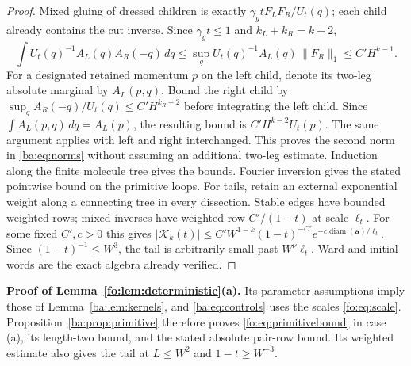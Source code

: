 \documentclass[11pt]{article}
\numberwithin{equation}{section}
\theoremstyle{remark}
\newcommand{\diam}{\operatorname{diam}}
\newcommand{\cK}{\mathcal K}
\begin{document}
\begin{proof}
Mixed gluing of dressed children is exactly $\gamma_g tF_LF_R/U_t(q)$;
each child already contains the cut inverse. Since $\gamma_g t\le1$
and $k_L+k_R=k+2$,
\[
 \int U_t(q)^{-1} A_L(q)A_R(-q)\,dq
 \le\sup_qU_t(q)^{-1} A_L(q)\,\|F_R\|_1
 \le C'H^{k-1}.
\]
For a designated retained momentum $p$ on the left child, denote
its two-leg absolute marginal by $A_L(p,q)$. Bound the right child
by \(\sup_q A_R(-q)/U_t(q)\le
C'H^{k_R-2}\) before integrating the left child.
Since \(\int A_L(p,q)\,dq=A_L(p)\), the resulting bound is
\(C'H^{k-2}U_t(p)\).
The same argument applies with left and right interchanged.
This proves the second norm in \eqref{ba:eq:norms} without assuming
an additional two-leg estimate. Induction along the finite molecule tree gives
the bounds. Fourier inversion gives the stated pointwise bound on the primitive loops.
For tails, retain an external exponential weight along a connecting
tree in every dissection. Stable edges have bounded weighted rows;
mixed inverses have weighted row $C'/(1-t)$ at scale $\ell_t$.
For some fixed $C',c>0$ this gives
$|\cK_k(t)|\le C'W^{1-k}(1-t)^{-C'}
e^{-c\diam(\boldsymbol a)/\ell_t}$. Since $(1-t)^{-1}\le W^3$,
the tail is arbitrarily small past $W^\nu\ell_t$.
Ward and initial words are the exact algebra already verified.
\end{proof}

\noindent\textbf{Proof of Lemma~\ref{fo:lem:deterministic}(a).}
Its parameter assumptions imply those of Lemma~\ref{ba:lem:kernels},
and \eqref{ba:eq:controls} uses the scales \eqref{fo:eq:scale}.
Proposition~\ref{ba:prop:primitive} therefore proves
\eqref{fo:eq:primitivebound} in case \textup{(a)}, its length-two
bound, and the stated absolute pair-row bound. Its weighted estimate
also gives the tail at $L\le W^2$ and $1-t\ge W^{-3}$.
\end{document}
